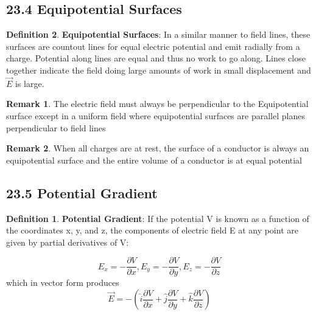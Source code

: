 \documentclass[12pt]{amsart}
\theoremstyle{definition}
\newtheorem{definition}{Definition} %
\newtheorem*{remark}{Remark}        %
\numberwithin{equation}{theorem}    %
\begin{document}
\subsection*{23.4 Equipotential Surfaces}

\begin{definition}
    \textbf{Equipotential Surfaces}:
    In a similar manner to field lines, these surfaces are countout lines for 
    equal electric potential and emit radially from a charge. Potential along lines
    are equal and thus no work to go along. Lines close together indicate the field doing 
    large amounts of work in small displacement and $\vec{E}$ is large.
    \begin{remark}
        The electric field must always be perpendicular to the Equipotential 
        surface except in a uniform field where equipotential surfaces 
        are parallel planes perpendicular to field lines
    \end{remark}

    \begin{remark}
        When all charges are at rest, the surface of a conductor is always an 
        equipotential surface and the entire volume of a conductor is at equal potential
    \end{remark}

    \subsection*{23.5 Potential Gradient}

    \begin{definition}
        \textbf{Potential Gradient}:
        If the poten­tial V is known as a function of the coordinates x, y,
        and z, the components of electric field E at any point are
        given by partial derivatives of V:

        $$E_x = -\frac{\partial V}{\partial x},E_y = -\frac{\partial V}{\partial y},
        E_z = -\frac{\partial V}{\partial z}   $$ which in vector form produces 
        $$\vec{E} = -(\hat{i}\frac{\partial V}{\partial x} 
        +\hat{j}\frac{\partial V}{\partial y} 
        + \hat{k}\frac{\partial V}{\partial z} )$$
    \end{definition}

\end{definition}
\end{document}
